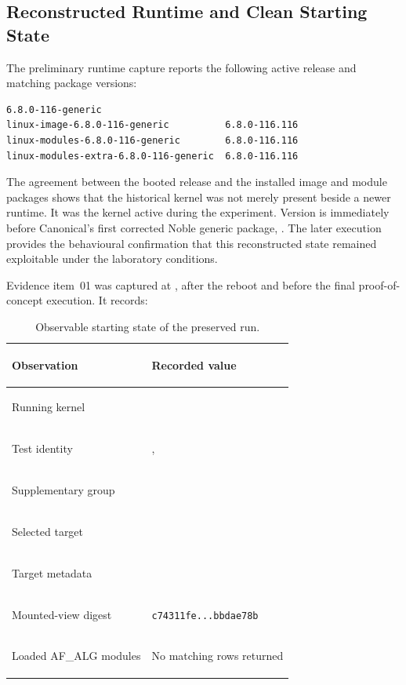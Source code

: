 \subsection{Reconstructed Runtime and Clean Starting State}

The preliminary runtime capture reports the following active release and
matching package versions:

\begin{lstlisting}
6.8.0-116-generic
linux-image-6.8.0-116-generic          6.8.0-116.116
linux-modules-6.8.0-116-generic        6.8.0-116.116
linux-modules-extra-6.8.0-116-generic  6.8.0-116.116
\end{lstlisting}

The agreement between the booted release and the installed image and module
packages shows that the historical kernel was not merely present beside a newer
runtime. It was the kernel active during the experiment. Version
 is immediately before Canonical's first corrected Noble
generic package,  \cite{ubuntu-copyfail-cve}. The later
execution provides the behavioural confirmation that this reconstructed state
remained exploitable under the laboratory conditions.

Evidence item~01 was captured at , after the
reboot and before the final proof-of-concept execution. It records:

\begin{table}[H]
    \centering
    \caption{Observable starting state of the preserved run.}
    \label{tab:phase02-pre-exploit-state}
    \small
    \begin{tabularx}{\textwidth}{@{}>{\bfseries\raggedright\arraybackslash}p{}Y@{}}
        \toprule
        Observation & Recorded value \\
        \midrule
        Running kernel &  \\
        Test identity & ,  \\
        Supplementary group &  \\
        Selected target &  \\
        Target metadata &  \\
        Mounted-view digest &
        \texttt{c74311fe...bbdae78b} \\
        Loaded AF\_ALG modules & No matching rows returned \\
        \bottomrule
    \end{tabularx}
\end{table}

